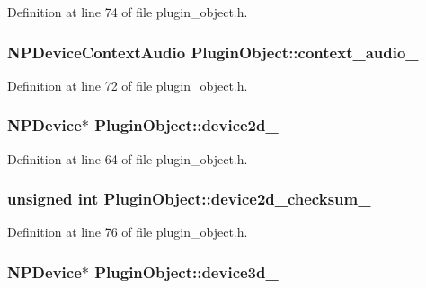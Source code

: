 Definition at line 74 of file plugin\_\-object.h.

\hypertarget{class_plugin_object_a29a7c72b105825ff135a29c9af9206f2}{
\subsubsection[{context\_\-audio\_\-}]{\setlength{\rightskip}{0pt plus 5cm}NPDeviceContextAudio {\bf PluginObject::context\_\-audio\_\-}}}
\label{class_plugin_object_a29a7c72b105825ff135a29c9af9206f2}


Definition at line 72 of file plugin\_\-object.h.

\hypertarget{class_plugin_object_a32c9649b557037cc8fbbf95f8c126c15}{
\subsubsection[{device2d\_\-}]{\setlength{\rightskip}{0pt plus 5cm}NPDevice$\ast$ {\bf PluginObject::device2d\_\-}}}
\label{class_plugin_object_a32c9649b557037cc8fbbf95f8c126c15}


Definition at line 64 of file plugin\_\-object.h.

\hypertarget{class_plugin_object_ac792c1966624836cbbadf26eaeae4e52}{
\subsubsection[{device2d\_\-checksum\_\-}]{\setlength{\rightskip}{0pt plus 5cm}unsigned int {\bf PluginObject::device2d\_\-checksum\_\-}}}
\label{class_plugin_object_ac792c1966624836cbbadf26eaeae4e52}


Definition at line 76 of file plugin\_\-object.h.

\hypertarget{class_plugin_object_af2fd117655e58027408e3cde1f7283fb}{
\subsubsection[{device3d\_\-}]{\setlength{\rightskip}{0pt plus 5cm}NPDevice$\ast$ {\bf PluginObject::device3d\_\-}}}
\label{class_plugin_object_af2fd117655e58027408e3cde1f7283fb}


